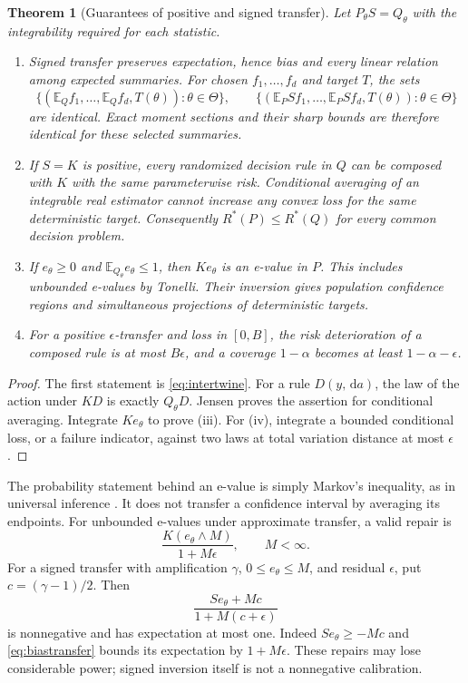 \documentclass[11pt]{article}
\numberwithin{equation}{section}
\newtheorem{theorem}{Theorem}[section]
\theoremstyle{definition}
\theoremstyle{remark}
\newcommand{\E}{\mathbb E}\newcommand{\Pp}{\mathbb P}\newcommand{\R}{\mathbb R}\newcommand{\N}{\mathbb N}
\newcommand{\dd}{\,\mathrm d}\newcommand{\norm}[1]{\left\lVert#1\right\rVert}\newcommand{\Scal}{\mathsf S}\newcommand{\Tcal}{\mathsf T}
\begin{document}
\begin{theorem}[Guarantees of positive and signed transfer]\label{thm:guarantees}
Let $P_\theta S=Q_\theta$ with the integrability required for each statistic.
\begin{enumerate}[label=(\roman*)]
\item Signed transfer preserves expectation, hence bias and every linear relation among expected summaries. For chosen $f_1,\ldots,f_d$ and target $T$, the sets
\[
 \{(\E_Q f_1,\ldots,\E_Q f_d,T(\theta)):\theta\in\Theta\},\qquad
 \{(\E_P Sf_1,\ldots,\E_P Sf_d,T(\theta)):\theta\in\Theta\}
\]
are identical. Exact moment sections and their sharp bounds are therefore identical for these selected summaries.
\item If $S=K$ is positive, every randomized decision rule in $Q$ can be composed with $K$ with the same parameterwise risk. Conditional averaging of an integrable real estimator cannot increase any convex loss for the same deterministic target. Consequently $R^*(P)\le R^*(Q)$ for every common decision problem.
\item If $e_\theta\ge0$ and $\E_{Q_\theta}e_\theta\le1$, then $Ke_\theta$ is an e-value in $P$. This includes unbounded e-values by Tonelli. Their inversion gives population confidence regions and simultaneous projections of deterministic targets.
\item For a positive $\epsilon$-transfer and loss in $[0,B]$, the risk deterioration of a composed rule is at most $B\epsilon$, and a coverage $1-\alpha$ becomes at least $1-\alpha-\epsilon$.
\end{enumerate}
\end{theorem}
\begin{proof}
The first statement is \eqref{eq:intertwine}. For a rule $D(y,\dd a)$, the law of the action under $KD$ is exactly $Q_\theta D$. Jensen proves the assertion for conditional averaging. Integrate $Ke_\theta$ to prove (iii). For (iv), integrate a bounded conditional loss, or a failure indicator, against two laws at total variation distance at most $\epsilon$.
\end{proof}
The probability statement behind an e-value is simply Markov's inequality, as in universal inference \cite{Wasserman2020}. It does not transfer a confidence interval by averaging its endpoints. For unbounded e-values under approximate transfer, a valid repair is
\begin{equation}\label{eq:clipE}
 \frac{K(e_\theta\wedge M)}{1+M\epsilon},\qquad M<\infty.
\end{equation}
For a signed transfer with amplification $\gamma$, $0\le e_\theta\le M$, and residual $\epsilon$, put $c=(\gamma-1)/2$. Then
\begin{equation}\label{eq:signedE}
 \frac{Se_\theta+Mc}{1+M(c+\epsilon)}
\end{equation}
is nonnegative and has expectation at most one. Indeed $Se_\theta\ge-Mc$ and \eqref{eq:biastransfer} bounds its expectation by $1+M\epsilon$. These repairs may lose considerable power; signed inversion itself is not a nonnegative calibration.
\end{document}
